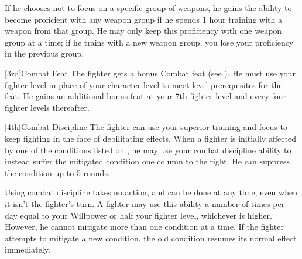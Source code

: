         If he chooses not to focus on a specific group of weapons, he gains the ability to become proficient with any weapon group if he spends 1 hour training with a weapon from that group.
        He may only keep this proficiency with one weapon group at a time; if he trains with a new weapon group, you lose your proficiency in the previous group.

        [3rd]{Combat Feat}
        The fighter gets a bonus Combat feat (see ).
        He must use your fighter level in place of your character level to meet level prerequisites for the feat.
        He gains an additional bonus feat at your 7th fighter level and every four fighter levels thereafter.

        [4th]{Combat Discipline}
        The fighter can use your superior training and focus to keep fighting in the face of debilitating effects.
        When a fighter is initially affected by one of the conditions listed on , he may use your combat discipline ability to instead suffer the mitigated condition one column to the right.
        He can suppress the condition up to 5 rounds.

        \par Using combat discipline takes no action, and can be done at any time, even when it isn't the fighter's turn.
        A fighter may use this ability a number of times per day equal to your Willpower or half your fighter level, whichever is higher.
        However, he cannot mitigate more than one condition at a time.
        If the fighter attempts to mitigate a new condition, the old condition resumes its normal effect immediately.

